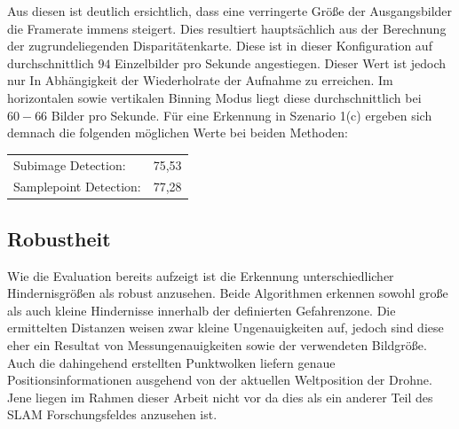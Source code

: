 \noindent
Aus diesen ist deutlich ersichtlich, dass eine verringerte Größe der Ausgangsbilder die Framerate immens steigert. Dies resultiert hauptsächlich aus der Berechnung der zugrundeliegenden Disparitätenkarte. Diese ist in dieser Konfiguration auf durchschnittlich $94$ Einzelbilder pro Sekunde angestiegen. Dieser Wert ist jedoch nur In Abhängigkeit der Wiederholrate der Aufnahme zu erreichen. Im horizontalen sowie vertikalen Binning Modus liegt diese durchschnittlich bei $60 - 66$ Bilder pro Sekunde. Für eine Erkennung in Szenario 1(c) ergeben sich demnach die folgenden möglichen Werte bei beiden Methoden:

\begin{table}[h]
\centering
\begin{tabular}{ll}
Subimage Detection:    & 75,53 \\
Samplepoint Detection: & 77,28
\end{tabular}
\end{table}

\subsection{Robustheit}
\label{subsec:discussion_robustness}
Wie die Evaluation bereits aufzeigt ist die Erkennung unterschiedlicher Hindernisgrößen als robust anzusehen. Beide Algorithmen erkennen sowohl große als auch kleine Hindernisse innerhalb der definierten Gefahrenzone. Die ermittelten Distanzen weisen zwar kleine Ungenauigkeiten auf, jedoch sind diese eher ein Resultat von Messungenauigkeiten sowie der verwendeten Bildgröße. Auch die dahingehend erstellten Punktwolken liefern genaue Positionsinformationen ausgehend von der aktuellen Weltposition der Drohne. Jene liegen im Rahmen dieser Arbeit nicht vor da dies als ein anderer Teil des SLAM Forschungsfeldes anzusehen ist.\\

